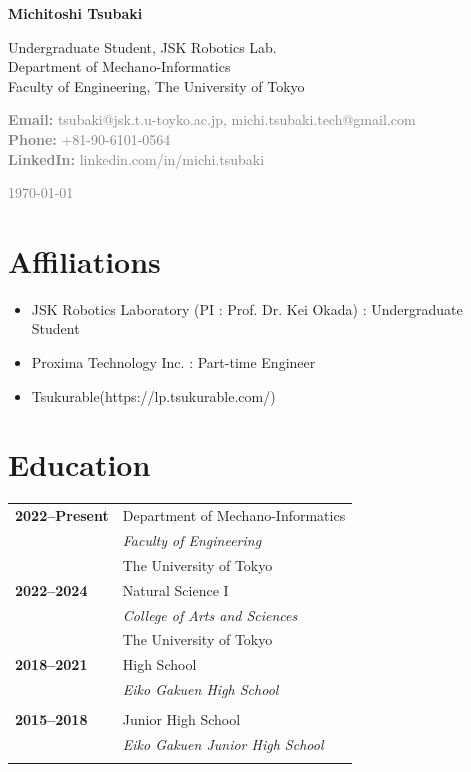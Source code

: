 \documentclass[11pt,a4paper]{article}
\newcommand{\cventry}[4]{\textbf{#1} & #2 \\ & \textit{#3} \\ & #4 \\[0.5em]}
\begin{document}
\begin{minipage}[t]{0.7\textwidth}
    \vspace{0pt}
    {\Huge\bfseries\color{darkblue} Michitoshi Tsubaki}
    \vspace{0.3cm}
    
    {\Large Undergraduate Student, JSK Robotics Lab.}\\
    Department of Mechano-Informatics\\
    Faculty of Engineering, The University of Tokyo
    \vspace{0.5cm}
    
    \textcolor{gray}{
    \textbf{Email:} tsubaki@jsk.t.u-toyko.ac.jp, michi.tsubaki.tech@gmail.com\\
    \textbf{Phone:} +81-90-6101-0564\\
    \textbf{LinkedIn:} linkedin.com/in/michi.tsubaki
    }
\end{minipage}
\hfill
\begin{minipage}[t]{0.25\textwidth}
    \vspace{0pt}
    \raggedleft
    \textcolor{gray}{\small \today}\\[0.3cm]
\end{minipage}

\vspace{1cm}

\section{Affiliations}
\begin{itemize}[leftmargin=1cm,itemsep=0.2em]
    \item JSK Robotics Laboratory (PI : Prof. Dr. Kei Okada) : Undergraduate Student
    \item Proxima Technology Inc. : Part-time Engineer 
    \item Tsukurable(https://lp.tsukurable.com/)
\end{itemize}

\section{Education}
\begin{tabularx}{\textwidth}{@{}p{2.5cm}X@{}}
\cventry{2022--Present}{Department of Mechano-Informatics}{Faculty of Engineering}{The University of Tokyo}
\cventry{2022--2024}{Natural Science I}{College of Arts and Sciences}{The University of Tokyo}
\cventry{2018--2021}{High School}{Eiko Gakuen High School}{}
\cventry{2015--2018}{Junior High School}{Eiko Gakuen Junior High School}{}
\end{tabularx}
\end{document}
